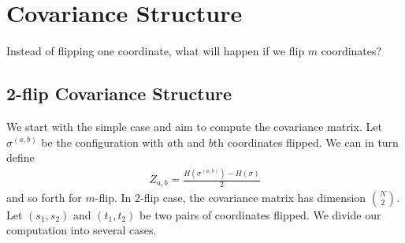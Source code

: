 \documentclass[10pt]{article}
\newcommand{\gy}[1]{\textbf{\color{red}[Yi: #1]}}
\newenvironment{Proof of lemma}{\noindent{\bf Proof of Lemma}}{\hfill$\Box$\newline}
\newenvironment{Proof of claim}{\noindent{\bf Proof of claim}}{\hfill$\Box$\newline}
\newenvironment{Proof of theorem}{\noindent{\bf Proof of Theorem}}{\hfill\scriptsize{$\Box$}\newline}
\newenvironment{Proof of theorems}{\noindent{\bf Proof of Theorems}}{\hfill$\Box$\newline}
\newenvironment{Proof of proposition}{\noindent{\bf Proof of Proposition}}{\hfill$\Box$\newline}
\newenvironment{Proof of propositions}{\noindent{\bf Proof of Propositions}}{\hfill$\Box$\newline}
\newenvironment{Proof of exercise}{\noindent{\it Proof of Exercise:}}{\hfill$\Box$}
\numberwithin{equation}{section}
\begin{document}
\section{Covariance Structure}
Instead of flipping one coordinate, what will happen if we flip $m$ coordinates? 
\subsection{2-flip Covariance Structure}
We start with the simple case and aim to compute the covariance matrix. Let $\sigma^{(a,b)}$ be the configuration with $a$th and $b$th coordinates flipped. We can in turn define 
\begin{align}
    Z_{a,b}=\frac{H(\sigma^{(a,b)})-H(\sigma)}{2}
\end{align}
and so forth for $m$-flip. In 2-flip case, the covariance matrix has dimension ${N \choose 2}$. Let $(s_1,s_2)$ and $(t_1,t_2)$ be two pairs of coordinates flipped. We divide our computation into several cases.
\end{document}

